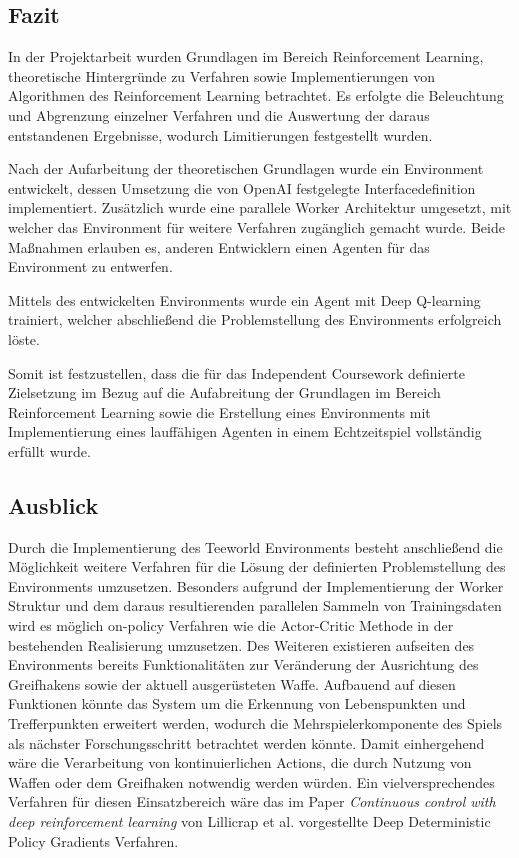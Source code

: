 \documentclass[11pt]{scrartcl}
\begin{document}
\subsection{Fazit}
In der Projektarbeit wurden Grundlagen im Bereich Reinforcement Learning, theoretische Hintergründe
zu Verfahren sowie Implementierungen von Algorithmen des Reinforcement Learning betrachtet. Es
erfolgte die Beleuchtung und Abgrenzung einzelner Verfahren und die Auswertung der daraus
entstandenen Ergebnisse, wodurch Limitierungen festgestellt wurden.

Nach der Aufarbeitung der theoretischen Grundlagen wurde ein Environment entwickelt, dessen
Umsetzung die von OpenAI festgelegte Interfacedefinition implementiert. Zusätzlich wurde eine
parallele Worker Architektur umgesetzt, mit welcher das Environment für weitere Verfahren
zugänglich gemacht wurde. Beide Maßnahmen erlauben es, anderen Entwicklern einen Agenten für
das Environment zu entwerfen.

Mittels des entwickelten Environments wurde ein Agent mit Deep Q-learning trainiert, welcher
abschließend die Problemstellung des Environments erfolgreich löste.

Somit ist festzustellen, dass die für das Independent Coursework definierte Zielsetzung
im Bezug auf die Aufabreitung der Grundlagen im Bereich Reinforcement Learning sowie die
Erstellung eines Environments mit Implementierung eines lauffähigen Agenten in einem
Echtzeitspiel vollständig erfüllt wurde. 

\newpage
\subsection{Ausblick}
Durch die Implementierung des Teeworld Environments besteht anschließend die Mög\-lich\-keit weitere Verfahren
für die Lösung der definierten Problemstellung des Environments umzusetzen. Besonders aufgrund der
Implementierung der Worker Struktur und dem daraus resultierenden parallelen Sammeln von Trainingsdaten
wird es möglich on-policy Verfahren wie die Actor-Critic Methode in der bestehenden Realisierung umzusetzen.
Des Weiteren existieren aufseiten des Environments bereits Funktionalitäten zur Veränderung der
Ausrichtung des Greifhakens sowie der aktuell ausgerüsteten Waffe. Aufbauend auf diesen Funktionen könnte
das System um die Erkennung von Lebenspunkten und Trefferpunkten erweitert werden, wodurch die
Mehrspielerkomponente des Spiels als nächster Forschungsschritt betrachtet werden könnte. Damit
einhergehend wäre die Verarbeitung von kontinuierlichen Actions, die durch Nutzung von Waffen oder dem
Greifhaken notwendig werden würden. Ein vielversprechendes Verfahren für diesen Einsatzbereich wäre
das im Paper \textit{Continuous control with deep reinforcement learning} von Lillicrap et al.
\cite{LHPHETSW2016} vorgestellte Deep Deterministic Policy Gradients Verfahren.
\end{document}
